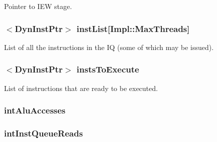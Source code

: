 \label{classInstructionQueue_a4e9ef25d8913b270d432be4bbfe4965c}
Pointer to IEW stage. \hypertarget{classInstructionQueue_a7f2828a4f877a4a4d4b85a6788536b82}{
\subsubsection[{instList}]{$<${\bf DynInstPtr}$>$ {\bf instList}\mbox{[}Impl::MaxThreads\mbox{]}}}
\label{classInstructionQueue_a7f2828a4f877a4a4d4b85a6788536b82}
List of all the instructions in the IQ (some of which may be issued). \hypertarget{classInstructionQueue_a494cb455333d9f34ee4a3ab8ca5e50fd}{
\subsubsection[{instsToExecute}]{$<${\bf DynInstPtr}$>$ {\bf instsToExecute}}}
\label{classInstructionQueue_a494cb455333d9f34ee4a3ab8ca5e50fd}
List of instructions that are ready to be executed. \hypertarget{classInstructionQueue_aec28ae6ca74e00e9b5eb0bd8bb9e1176}{
\subsubsection[{intAluAccesses}]{ {\bf intAluAccesses}}}
\label{classInstructionQueue_aec28ae6ca74e00e9b5eb0bd8bb9e1176}
\hypertarget{classInstructionQueue_a80520cf10aa5e634d9e3fb6cdc0aef2f}{
\subsubsection[{intInstQueueReads}]{ {\bf intInstQueueReads}}}
